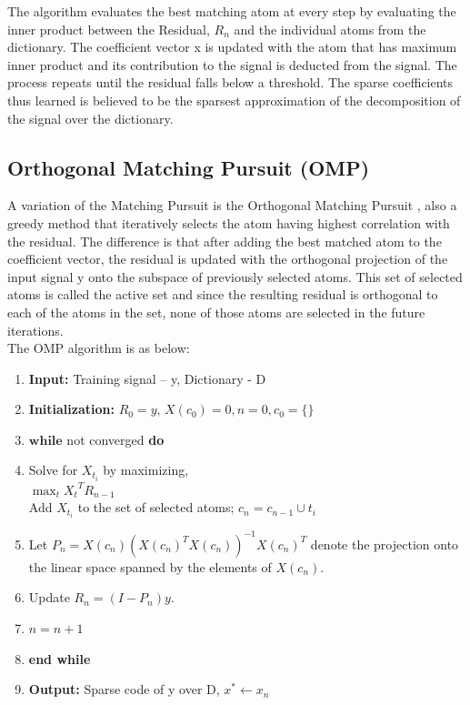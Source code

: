 \documentclass{article} %
\begin{document}
The algorithm evaluates the best matching atom at every step by evaluating the inner product between the Residual, $R_n$ and the individual atoms from the dictionary. The coefficient vector x is updated with the atom that has maximum inner product and its contribution to the signal is deducted from the signal. The process repeats until the residual falls below a threshold. The sparse coefficients thus learned is believed to be the sparsest approximation of the decomposition of the signal over the dictionary.

\subsection{Orthogonal Matching Pursuit (OMP)}
A variation of the Matching Pursuit is the Orthogonal Matching Pursuit \cite{pati1993orthogonal}, also a greedy method that iteratively selects the atom having highest correlation with the residual. The difference is that after adding the best matched atom to the coefficient vector, the residual is updated with the orthogonal projection of the input signal y onto the subspace of previously selected atoms. This set of selected atoms is called the active set and since the resulting residual is orthogonal to each of the atoms in the set, none of those atoms are selected in the future iterations. \\

The OMP algorithm is as below:

\begin{enumerate}
\item \textbf{Input:} Training signal – y, Dictionary - D
\item \textbf{Initialization:} $R_0=y$, $X(c_0)=0, n=0, c_0 = \{\}$
\item $\textbf{while}$ not converged \textbf{do}
\item \hspace*{.4cm} Solve for $X_{t_i}$ by maximizing,\\
\hspace*{.4cm} $\max_t{{X_t}^TR_{n-1}}$\\
\hspace*{.4cm} Add $X_{t_i}$ to the set of selected atoms; $c_n = c_{n-1}\cup {t_i}$
\item \hspace*{.4cm} Let $P_n = X(c_n){(X(c_n)^TX(c_n))}^{-1}{X(c_n)}^T$ denote the projection onto the linear space spanned by the elements of $X(c_n)$. 
\item \hspace*{.4cm} Update $R_n = (I - P_n)y$.
\item \hspace*{.4cm} $n=n+1$
\item \textbf{end while}
\item \textbf{Output: }Sparse code of y over D, $x^* \leftarrow x_n$
\end{enumerate}
\end{document}
